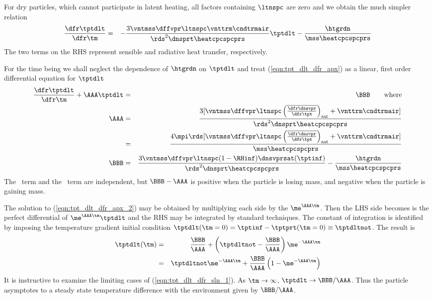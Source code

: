 \documentclass[12pt,twoside]{book}
\begin{document}
For dry particles, which cannot participate in latent heating, 
all factors containing $\ltnspc$ are zero and we obtain the much simpler
relation
\begin{eqnarray}
\frac{\dfr\tptdlt}{\dfr\tm} 
& = & 
- \frac{3 \vntmss \dffvpr \ltnspc \vnttrm \cndtrmair}
{\rds^{2} \dnsprt \heatcpcspcprs} \tptdlt
- \frac{\htgrdn}{\mss \heatcpcspcprs}
\label{eqn:tpt_dlt_dfr_dry}
\end{eqnarray}
The two terms on the RHS represent sensible and radiative heat
transfer, respectively. 

For the time being we shall neglect the dependence of $\htgrdn$ on
$\tptdlt$ and treat (\ref{eqn:tpt_dlt_dfr_apx}) as a 
linear, first order differential equation for $\tptdlt$ 
\begin{eqnarray}
\frac{\dfr\tptdlt}{\dfr\tm} + \AAA \tptdlt & = & \BBB \qquad \mbox{where} \\
\AAA 
& = & 
\frac{3 [\vntmss \dffvpr \ltnspc 
\left( \overline{\frac{\dfr\dnsvpr}{\dfr\tpt}} \right)_{\mathrm{sat}} +
\vnttrm \cndtrmair ]}{\rds^{2} \dnsprt \heatcpcspcprs}
\nonumber \\
& = & 
\frac{4 \mpi \rds [\vntmss \dffvpr \ltnspc 
\left(\overline{\frac{\dfr\dnsvpr}{\dfr\tpt}} \right)_{\mathrm{sat}} +
\vnttrm \cndtrmair ]}{\mss \heatcpcspcprs}
\nonumber \\
\BBB & = & 
\frac{3 \vntmss \dffvpr \ltnspc ( 1 - \RHinf ) \dnsvprsat ( \tptinf )}
{\rds^{2} \dnsprt \heatcpcspcprs} 
- \frac{\htgrdn}{\mss \heatcpcspcprs} \nonumber
\label{eqn:tpt_dlt_dfr_apx_2}
\end{eqnarray}
The \AAA\ term and the \BBB\ term are independent, but $\BBB - \AAA$
is positive when the particle is losing mass, and negative when the
particle is gaining mass. 

The solution to (\ref{eqn:tpt_dlt_dfr_apx_2}) may be obtained by
multiplying each side by the  
$\me^{\AAA \tm}$. 
Then the LHS side becomes is the perfect differential of $\me^{\AAA \tm}
\tptdlt$ and the RHS may be integrated by standard techniques.
The constant of integration is identified by imposing the
temperature gradient initial condition
$\tptdlt(\tm = 0) = \tptinf - \tptprt(\tm = 0) \equiv \tptdltnot$.
The result is 
\begin{eqnarray}
\tptdlt( \tm ) & = & \frac{\BBB}{\AAA} + 
\left( \tptdltnot - \frac{\BBB}{\AAA} \right) \me^{-\AAA \tm} 
\nonumber \\ 
& = & \tptdltnot \me^{-\AAA \tm} + 
\frac{\BBB}{\AAA} \left( 1 - \me^{-\AAA \tm} \right)
\label{eqn:tpt_dlt_dfr_sln_1}
\end{eqnarray}
It is instructive to examine the limiting cases of
(\ref{eqn:tpt_dlt_dfr_sln_1}). 
As $\tm \rightarrow \infty$, $\tptdlt \rightarrow \BBB/\AAA$.
Thus the particle asymptotes to a steady state temperature
difference with the environment given by $\BBB/\AAA$.
\end{document}
